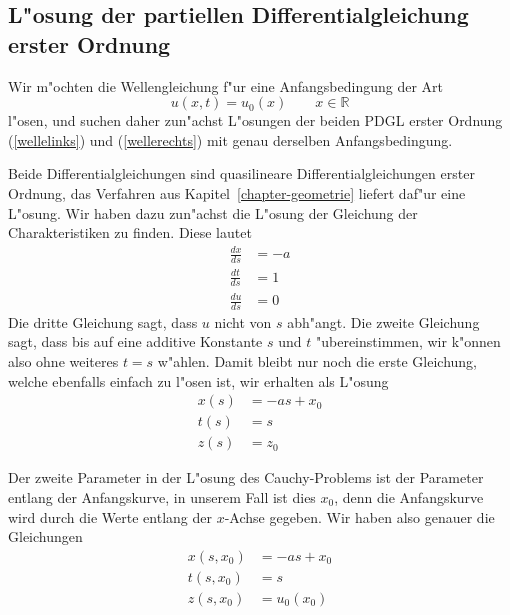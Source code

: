 \subsection{L"osung der partiellen Differentialgleichung erster Ordnung}
Wir m"ochten die Wellengleichung f"ur eine Anfangsbedingung der Art
\begin{equation}
u(x,t)=u_0(x)\qquad x\in\mathbb R
\label{welleanfang}
\end{equation}
l"osen, und suchen daher zun"achst L"osungen der beiden
PDGL erster Ordnung (\ref{wellelinks}) und (\ref{wellerechts})
mit genau derselben Anfangsbedingung.

Beide Differentialgleichungen sind quasilineare Differentialgleichungen
erster Ordnung, das Verfahren aus Kapitel~\ref{chapter-geometrie}
liefert daf"ur eine L"osung. Wir haben dazu zun"achst die L"osung der
Gleichung der Charakteristiken zu finden. Diese lautet
\begin{align*}
\frac{dx}{ds}&=-a
\\
\frac{dt}{ds}&=1
\\
\frac{du}{ds}&=0
\end{align*}
Die dritte Gleichung sagt, dass $u$ nicht von $s$ abh"angt. Die
zweite Gleichung sagt, dass bis auf eine additive Konstante $s$
und $t$ "ubereinstimmen, wir k"onnen also ohne weiteres $t=s$
w"ahlen. Damit bleibt nur noch die erste Gleichung, welche ebenfalls
einfach zu l"osen ist, wir erhalten als L"osung
\begin{equation}
\begin{aligned}
x(s)&=-as+x_0\\
t(s)&=s\\
z(s)&=z_0
\end{aligned}
\label{hyperbolisch:quasi1}
\end{equation}

Der zweite Parameter in der L"osung des Cauchy-Problems ist der
Parameter entlang der Anfangskurve, in unserem Fall ist dies $x_0$,
denn die Anfangskurve wird durch die Werte entlang der $x$-Achse
gegeben. Wir haben also genauer die Gleichungen
\begin{equation}
\begin{aligned}
x(s,x_0)&=-as+x_0\\
t(s,x_0)&=s\\
z(s,x_0)&=u_0(x_0)
\end{aligned}
\label{hyperbolisch:quasi2}
\end{equation}

